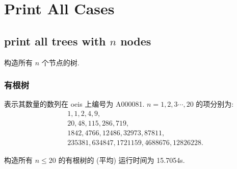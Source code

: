 \documentclass[UTF8, a4paper, titlepage, twoside]{ctexart}
\begin{document}
\newpage
\section{ Print All Cases }
\subsection{ print all trees with \(n\) nodes }
构造所有 $n$ 个节点的树.

\subsubsection{ 有根树 }

表示其数量的数列在 oeis 上编号为 A000081.
\(n = 1, 2, 3 \cdots, 20\) 的项分别为:
\[
    \begin{aligned}
         & 1, 1, 2, 4, 9,                              \\
         & 20, 48, 115, 286, 719,                      \\
         & 1842, 4766, 12486, 32973, 87811,            \\
         & 235381, 634847, 1721159, 4688676, 12826228.
    \end{aligned}
\]

构造所有 $n \leq 20$ 的有根树的 (平均) 运行时间为 15.7054s.
\end{document}
